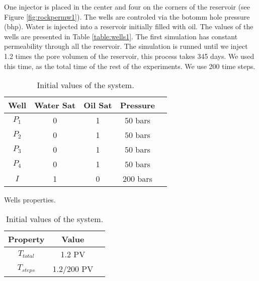\documentclass[12pt]{article}
\begin{document}
One injector is placed in the center and four on the corners of the reservoir (see Figure \ref{fig:rockpermw1}). The wells are controled via the botomm hole pressure (bhp). 
 Water is injected into a reservoir initially filled with oil. The values of the wells are presented in Table \ref{table:wells1}. The first simulation has constant permeability through all the reservoir. The simulation is runned until we inject 1.2 times the pore volumen of the reservoir, this process takes 345 days. We used this time, as the total time of the rest of the experiments. We use 200 time steps.    
\begin{table}[!ht]
\hspace{-0cm}
\begin{minipage}{.5\textwidth}
\centering
\begin{tabular}{ |c|c|c|c|c|} 
\hline
Well&Water Sat&Oil Sat&Pressure\\
\hline
$P_1$&     0&    1 & $50$ bars \\  
$P_2$& 0& 1& $50$ bars\\
$P_3$&     0&    1 & $50$ bars \\  
$P_4$& 0& 1& $50$ bars\\
$I$&     1&    0 & $200$ bars\\  
\hline
\end{tabular}
\caption{Wells properties.}\label{table:wells1}
\end{minipage}%
\begin{minipage}{.4\textwidth}
\centering
\begin{tabular}{ |c|c|c|} 
\hline
Property&Value\\
\hline
    $T_{total}$&     1.2 PV\\
$T_{steps}$& 1.2/200 PV\\
\hline
\end{tabular}\caption{Initial values of the system.}
\label{table:icw}
\end{minipage}
\hspace{1cm} 
\end{table} 
\end{document}
